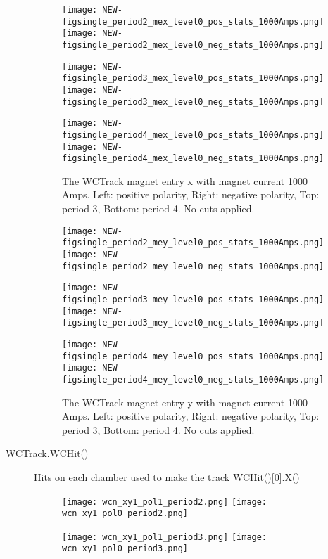 \begin{description}
{     \begin{figure}[h]	  
       \centering       
        	\texttt{[image: NEW-figsingle\_period2\_mex\_level0\_pos\_stats\_1000Amps.png]}
	 \texttt{[image: NEW-figsingle\_period2\_mex\_level0\_neg\_stats\_1000Amps.png]}
	 
   	\texttt{[image: NEW-figsingle\_period3\_mex\_level0\_pos\_stats\_1000Amps.png]}
	 \texttt{[image: NEW-figsingle\_period3\_mex\_level0\_neg\_stats\_1000Amps.png]}
	 
 	\texttt{[image: NEW-figsingle\_period4\_mex\_level0\_pos\_stats\_1000Amps.png]}
	 \texttt{[image: NEW-figsingle\_period4\_mex\_level0\_neg\_stats\_1000Amps.png]}
   \caption[short]{The WCTrack magnet entry x with magnet current 1000 Amps. Left: positive polarity, Right: negative polarity, Top: period 3, Bottom: period 4. No cuts applied.}
   \label{fig_mex}
  \end{figure}
  
       \begin{figure}[h]	
         \centering      
        	\texttt{[image: NEW-figsingle\_period2\_mey\_level0\_pos\_stats\_1000Amps.png]}
	 \texttt{[image: NEW-figsingle\_period2\_mey\_level0\_neg\_stats\_1000Amps.png]}
	 
   	\texttt{[image: NEW-figsingle\_period3\_mey\_level0\_pos\_stats\_1000Amps.png]}
	 \texttt{[image: NEW-figsingle\_period3\_mey\_level0\_neg\_stats\_1000Amps.png]}
	 
 	\texttt{[image: NEW-figsingle\_period4\_mey\_level0\_pos\_stats\_1000Amps.png]}
	 \texttt{[image: NEW-figsingle\_period4\_mey\_level0\_neg\_stats\_1000Amps.png]}
   \caption[short]{The WCTrack magnet entry y with magnet current 1000 Amps. Left: positive polarity, Right: negative polarity, Top: period 3, Bottom: period 4. No cuts applied.}
   \label{fig_mey}
  \end{figure}
  
  
}
\item[WCTrack.WCHit()]{
Hits on each chamber used to make the track  WCHit()[0].X()

       \begin{figure}[h]	   
         \centering   
        	\texttt{[image: wcn\_xy1\_pol1\_period2.png]}
	 \texttt{[image: wcn\_xy1\_pol0\_period2.png]}
	 
        	\texttt{[image: wcn\_xy1\_pol1\_period3.png]}
	 \texttt{[image: wcn\_xy1\_pol0\_period3.png]}
	 

\end{figure}}
\end{description}
